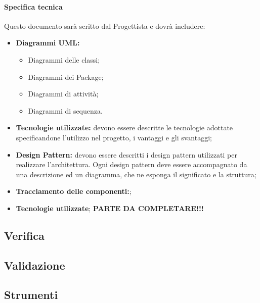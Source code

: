\paragraph{Specifica tecnica}
Questo documento sarà scritto dal Progettista e dovrà includere:
\begin{itemize}
\item \textbf{Diagrammi UML:}
	\begin{itemize}
	\item Diagrammi delle classi;
	\item Diagrammi dei Package;
	\item Diagrammi di attività;
	\item Diagrammi di sequenza.
	\end{itemize}
\item \textbf{Tecnologie utilizzate:} devono essere descritte le tecnologie adottate specificandone l’utilizzo nel progetto, i vantaggi e gli svantaggi;
\item \textbf{Design Pattern:}  devono essere descritti i design pattern utilizzati per realizzare l’architettura. Ogni design pattern deve essere accompagnato da una descrizione ed un diagramma, che ne esponga il significato e la struttura;
\item \textbf{Tracciamento delle componenti:};
\item \textbf{Tecnologie utilizzate};
\textbf{PARTE DA COMPLETARE!!!}
\end{itemize}

\subsection{Verifica}

\subsection{Validazione}
\subsection{Strumenti}

